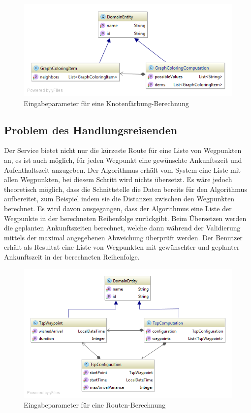 \begin{figure}[h]
\centering
\includegraphics[scale=0.5]{images/probleme/graphcoloring.png}
\caption[Eingabeparameter für eine Knotenfärbung-Berechnung]{Eingabeparameter für eine Knotenfärbung-Berechnung \selfmade{}}
\label{fig:graphcoloring_input}
\end{figure}

%
%
%
%

\subsection{Problem des Handlungsreisenden}
Der Service bietet nicht nur die kürzeste Route für eine Liste von Wegpunkten an, es ist auch möglich, für jeden Wegpunkt eine gewünschte Ankunftszeit und Aufenthaltszeit anzugeben. Der 
Algorithmus erhält vom System eine Liste mit allen Wegpunkten, bei diesem Schritt wird nichts übersetzt. Es wäre jedoch theoretisch möglich, dass die Schnittstelle die Daten bereits für den 
Algorithmus aufbereitet, zum Beispiel indem sie die Distanzen zwischen den Wegpunkten berechnet. Es wird davon ausgegangen, dass der Algorithmus eine Liste der Wegpunkte in der 
berechneten Reihenfolge zurückgibt. Beim Übersetzen werden die geplanten Ankunftszeiten berechnet, welche dann während der Validierung mittels der maximal angegebenen Abweichung 
überprüft werden. Der Benutzer erhält als Resultat eine Liste von Wegpunkten mit gewünschter und geplanter Ankunftszeit in der berechneten Reihenfolge.

\begin{figure}[h]
\centering
\includegraphics[scale=0.5]{images/probleme/tsp.png}
\caption[Eingabeparameter für eine Routen-Berechnung]{Eingabeparameter für eine Routen-Berechnung \selfmade{}}
\label{fig:tsp_input}
\end{figure}

